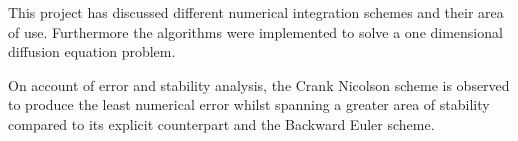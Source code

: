 This project has discussed different numerical integration schemes
and their area of use. Furthermore the algorithms were implemented
to solve a one dimensional diffusion equation problem.

On account of error and stability analysis, the Crank Nicolson
scheme is observed to produce the least numerical error whilst
spanning a greater area of stability compared to its explicit
counterpart and the Backward Euler scheme.
